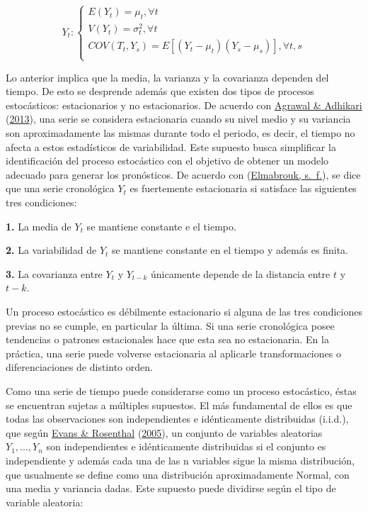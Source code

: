 \documentclass[
]{article}
\begin{document}
\begin{equation}
\label{eqn:ecuacion_estocastico}
Y_t:
\begin{cases}
E(Y_t) = \mu_t, \forall t \\
V(Y_t) = \sigma^2_t, \forall t \\
COV(T_t,Y_s) = E\left[(Y_t-\mu_t)(Y_s-\mu_s)\right], \forall t,s \\
\end{cases}
\end{equation}

Lo anterior implica que la media, la varianza y la covarianza dependen
del tiempo. De esto se desprende además que existen dos tipos de
procesos estocásticos: estacionarios y no estacionarios. De acuerdo con
\protect\hyperlink{ref-stationary_def}{Agrawal \& Adhikari}
(\protect\hyperlink{ref-stationary_def}{2013}), una serie se considera
estacionaria cuando su nivel medio y su variancia son aproximadamente
las mismas durante todo el periodo, es decir, el tiempo no afecta a
estos estadísticos de variabilidad. Este supuesto busca simplificar la
identificación del proceso estocástico con el objetivo de obtener un
modelo adecuado para generar los pronósticos. De acuerdo con
(\protect\hyperlink{ref-definicion_estocastico}{Elmabrouk, s.~f.}), se
dice que una serie cronológica \(Y_t\) es fuertemente estacionaria si
satisface las siguientes tres condiciones:

\textbf{1.} La media de \(Y_t\) se mantiene constante e el tiempo.

\textbf{2.} La variabilidad de \(Y_t\) se mantiene constante en el
tiempo y además es finita.

\textbf{3.} La covarianza entre \(Y_t\) y \(Y_{t-k}\) únicamente depende
de la distancia entre \(t\) y \(t-k\).

Un proceso estocástico es débilmente estacionario si alguna de las tres
condiciones previas no se cumple, en particular la última. Si una serie
cronológica posee tendencias o patrones estacionales hace que esta sea
no estacionaria. En la práctica, una serie puede volverse estacionaria
al aplicarle transformaciones o diferenciaciones de distinto orden.

Como una serie de tiempo puede considerarse como un proceso estocástico,
éstas se encuentran sujetas a múltiples supuestos. El más fundamental de
ellos es que todas las observaciones son independientes e idénticamente
distribuidas (i.i.d.), que según
\protect\hyperlink{ref-definicion_iid}{Evans \& Rosenthal}
(\protect\hyperlink{ref-definicion_iid}{2005}), un conjunto de variables
aleatorias \(Y_1,...,Y_n\) son independientes e idénticamente
distribuidas si el conjunto es independiente y además cada una de las n
variables sigue la misma distribución, que usualmente se define como una
distribución aproximadamente Normal, con una media y variancia dadas.
Este supuesto puede dividirse según el tipo de variable aleatoria:
\end{document}
